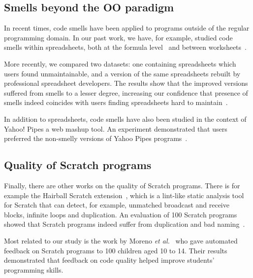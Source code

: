 \documentclass{sig-alternate}
\newcommand{\todo}[1]{\textbf{#1}}
\begin{document}
\subsection{Smells beyond the OO paradigm}
In recent times, code smells have been applied to programs outside of the regular programming domain. In our past work, we have, for example, studied code smells within spreadsheets, both at the formula level~\cite{hermans_detecting_2014} and between worksheets~\cite{hermans_detecting_2012}.

More recently, we compared two datasets: one containing spreadsheets which users found unmaintainable, and a version of the same spreadsheets rebuilt by professional spreadsheet developers. The results show that the improved versions suffered from smells to a lesser degree, increasing our confidence that presence of smells indeed coincides with users finding spreadsheets hard to maintain~\cite{jansen_code_2015}.

In addition to spreadsheets, code smells have also been studied in the context of Yahoo! Pipes a web mashup tool. An experiment demonstrated that users preferred the non-smelly versions of Yahoo Pipes programs~\cite{stolee_refactoring_2011}. 


\subsection{Quality of Scratch programs}
Finally, there are other works on the quality of Scratch programs. There is for example the Hairball Scratch extension~\cite{boe_hairball:_2013}, which is a lint-like static analysis tool for Scratch that can detect, for example, unmatched broadcast and receive blocks, infinite loops and duplication. An evaluation of 100 Scratch programs showed that Scratch programs indeed suffer from duplication and bad naming~\cite{moreno_automatic_2014}.

Most related to our study is the work by Moreno \emph{et al.}~\cite{moreno-leon_dr._2015} who gave automated feedback on Scratch programs to 100 children aged 10 to 14. Their results demonstrated that feedback on code quality helped improve students' programming skills.




\end{document}
